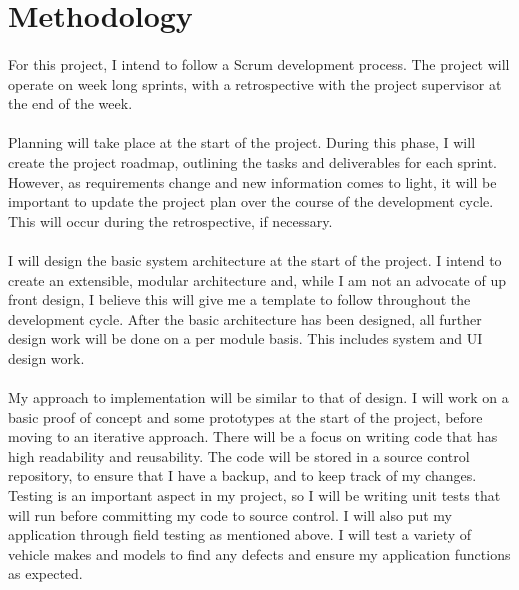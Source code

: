 \section{Methodology}
	\paragraph{}{
	For this project, I intend to follow a Scrum development process. The project will operate on week long sprints, with a retrospective with the project supervisor at the end of the week.
	}
	\paragraph{}{
	Planning will take place at the start of the project. During this phase, I will create the project roadmap, outlining the tasks and deliverables for each sprint. However, as requirements change and new information comes to light, it will be important to update the project plan over the course of the development cycle. This will occur during the retrospective, if necessary.
	}
	\paragraph{}{
	I will design the basic system architecture at the start of the project. I intend to create an extensible, modular architecture and, while I am not an advocate of up front design, I believe this will give me a template to follow throughout the development cycle. After the basic architecture has been designed, all further design work will be done on a per module basis. This includes system and UI design work.
	}
	\paragraph{}{
 	My approach to implementation will be similar to that of design. I will work on a basic proof of concept and some prototypes at the start of the project, before moving to an iterative approach. There will be a focus on writing code that has high readability and reusability. The code will be stored in a source control repository, to ensure that I have a backup, and to keep track of my changes. Testing is an important aspect in my project, so I will be writing unit tests that will run before committing my code to source control. I will also put my application through field testing as mentioned above. I will test a variety of vehicle makes and models to find any defects and ensure my application functions as expected. 
	}

